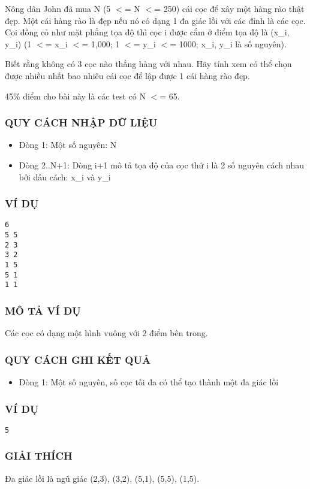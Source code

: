 



   Nông dân John đã mua N (5 $<$= N $<$= 250) cái cọc để xây một hàng rào thật đẹp. Một cái hàng rào là đẹp nếu nó có dạng 1 đa giác lồi với các đỉnh là các cọc. Coi đồng cỏ như mặt phẳng tọa độ thì cọc i được cắm ở điểm tọa độ là (x\_i, y\_i) (1 $<$= x\_i $<$= 1,000; 1 $<$= y\_i $<$= 1000; x\_i, y\_i là số nguyên).  

   Biết rằng không có 3 cọc nào thẳng hàng với nhau. Hãy tính xem có thể chọn được nhiều nhất bao nhiêu cái cọc để lập được 1 cái hàng rào đẹp.  

   45\% điểm cho bài này là các test có N $<$= 65.  

\subsubsection{   QUY CÁCH NHẬP DỮ LIỆU  }
\begin{itemize}
	\item     Dòng 1: Một số nguyên: N   
	\item     Dòng 2..N+1: Dòng i+1 mô tả tọa độ của cọc thứ i là 2 số nguyên         cách nhau bởi dấu cách: x\_i và y\_i   
\end{itemize}

\subsubsection{   VÍ DỤ  }
\begin{verbatim}
6
5 5
2 3
3 2
1 5
5 1
1 1
\end{verbatim}

\subsubsection{   MÔ TẢ VÍ DỤ  }

   Các cọc có dạng một hình vuông với 2 điểm bên trong.  

\subsubsection{   QUY CÁCH GHI KẾT QUẢ  }
\begin{itemize}
	\item     Dòng 1: Một số nguyên, số cọc tối đa có thể tạo thành một đa giác lồi   
\end{itemize}

\subsubsection{   VÍ DỤ  }
\begin{verbatim}
5
\end{verbatim}

\subsubsection{   GIẢI THÍCH  }

   Đa giác lồi là ngũ giác (2,3), (3,2), (5,1), (5,5), (1,5).  